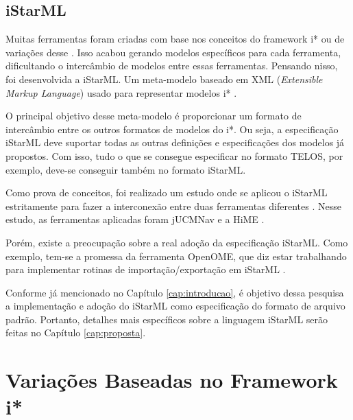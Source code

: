         \subsection{iStarML}
                Muitas ferramentas foram criadas com base nos conceitos do framework i* ou de variações desse \cite{cares2012towards} \cite{cares2011towards}.
                Isso acabou gerando modelos específicos para cada ferramenta, dificultando o intercâmbio de modelos entre essas ferramentas.
                Pensando nisso, foi desenvolvida a iStarML.
                Um meta-modelo baseado em XML (\emph{Extensible Markup Language}) usado para representar modelos i* \cite{cares2008istarml}.
                
                O principal objetivo desse meta-modelo é proporcionar um formato de intercâmbio entre os outros formatos de modelos do i*.
                Ou seja, a especificação iStarML deve suportar todas as outras definições e especificações dos modelos já propostos.
                Com isso, tudo o que se consegue especificar no formato TELOS, por exemplo, deve-se conseguir também no formato iStarML.

                Como prova de conceitos, foi realizado um estudo onde se aplicou o iStarML estritamente para fazer a interconexão entre duas ferramentas diferentes \cite{colomer2011model}.
                Nesse estudo, as ferramentas aplicadas foram jUCMNav \cite{kealey2006integrating} e a HiME \cite{lopez2009hime}.

                Porém, existe a preocupação sobre a real adoção da especificação iStarML. Como exemplo, tem-se a promessa da ferramenta OpenOME, que diz estar trabalhando para implementar rotinas de importação/exportação em iStarML \cite{horkoff2011openome} \cite{laue2011adding}.

                Conforme já mencionado no Capítulo \ref{cap:introducao}, é objetivo dessa pesquisa a implementação e adoção do iStarML como especificação do formato de arquivo padrão. Portanto, detalhes mais específicos sobre a linguagem iStarML serão feitas no Capítulo \ref{cap:proposta}.

    \section{Variações Baseadas no Framework i*}
        \label{cap:framework-sec:variacoes}


